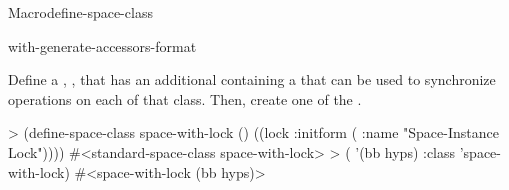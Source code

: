 \documentclass[10pt,twoside,english,pdftex]{article}
\begin{document}
\begin{functiondoc}{Macro}{define-space-class}
\begin{alsos}{with-generate-accessors-format}
\end{alsos}

\fnexample 
{}%
Define a ,
, that has an additional 
containing a  that can be used to synchronize
operations on each  of that class. Then, create
one  of the 
.
%
\W\supp
\begin{example}
> (define-space-class space-with-lock ()
    ((lock :initform ( :name "Space-Instance Lock"))))
#<standard-space-class space-with-lock>
> ( '(bb hyps) 
    :class 'space-with-lock)
#<space-with-lock (bb hyps)>
\end{example}

\end{functiondoc}

\end{document}
